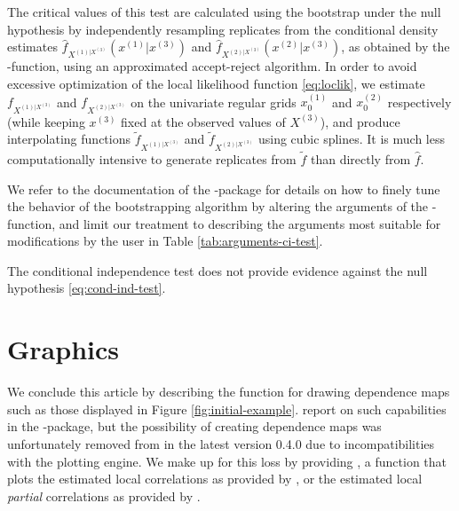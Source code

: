 The critical values of this test are calculated using the bootstrap under the null hypothesis by independently resampling replicates from
the conditional density estimates \(\widehat f_{X^{(1)|X^{(3)}}}(x^{(1)}|x^{(3)})\) and \(\widehat f_{X^{(2)|X^{(3)}}}(x^{(2)}|x^{(3)})\), as obtained by the -function, using an approximated accept-reject algorithm. In order to avoid excessive optimization of the local likelihood function \eqref{eq:loclik}, we estimate \(f_{X^{(1)|X^{(3)}}}\) and \(f_{X^{(2)|X^{(3)}}}\) on the univariate regular grids \(x_0^{(1)}\) and \(x_0^{(2)}\) respectively (while keeping \(x^{(3)}\) fixed at the observed values of \(X^{(3)}\)), and produce interpolating functions \(\tilde f_{X^{(1)|X^{(3)}}}\) and \(\tilde f_{X^{(2)|X^{(3)}}}\) using cubic splines. It is much less computationally intensive to generate replicates from \(\tilde f\) than directly from \(\widehat f\).

We refer to the documentation of the -package for details on how to finely tune the behavior of the bootstrapping algorithm by altering the arguments of the -function, and limit our treatment to describing the arguments most suitable for modifications by the user in Table \ref{tab:arguments-ci-test}.

The conditional independence test does not provide evidence against the null hypothesis \eqref{eq:cond-ind-test}.

\section{Graphics}\label{chap:graphics}

We conclude this article by describing the  function for drawing dependence maps such as those displayed in Figure \ref{fig:initial-example}. \citet{bere:klep:tjos:2014} report on such capabilities in the -package, but the possibility of creating dependence maps was unfortunately removed from  in the latest version 0.4.0 due to incompatibilities with the  \citep{wick:2016} plotting engine. We make up for this loss by providing , a function that plots the estimated local correlations as provided by , or the estimated local \emph{partial} correlations as provided by .

